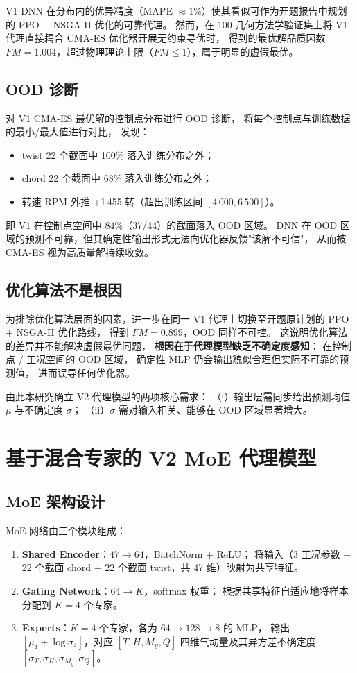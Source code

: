 V1 DNN 在分布内的优异精度（MAPE $\approx 1\%$）使其看似可作为开题报告中规划的 PPO + NSGA-II 优化的可靠代理。
然而，在 100 几何方法学验证集上将 V1 代理直接耦合 CMA-ES 优化器开展无约束寻优时，
得到的最优解品质因数 $FM = 1.004$，超过物理理论上限（$FM \leq 1$），属于明显的虚假最优。

\subsection{OOD 诊断}

对 V1 CMA-ES 最优解的控制点分布进行 OOD 诊断，
将每个控制点与训练数据的最小/最大值进行对比，
发现：
\begin{itemize}
  \item twist 22 个截面中 100\% 落入训练分布之外；
  \item chord 22 个截面中 68\% 落入训练分布之外；
  \item 转速 $\text{RPM}$ 外推 +1\,455 转（超出训练区间 $[4\,000, 6\,500]$）。
\end{itemize}
即 V1 在控制点空间中 84\%（37/44）的截面落入 OOD 区域。
DNN 在 OOD 区域的预测不可靠，但其确定性输出形式无法向优化器反馈"该解不可信"，
从而被 CMA-ES 视为高质量解持续收敛。

\subsection{优化算法不是根因}

为排除优化算法层面的因素，进一步在同一 V1 代理上切换至开题原计划的 PPO + NSGA-II 优化路线，
得到 $FM = 0.899$，OOD 同样不可控。
这说明优化算法的差异并不能解决虚假最优问题，
\textbf{根因在于代理模型缺乏不确定度感知}：
在控制点 / 工况空间的 OOD 区域，
确定性 MLP 仍会输出貌似合理但实际不可靠的预测值，
进而误导任何优化器。

由此本研究确立 V2 代理模型的两项核心需求：
（i）输出层需同步给出预测均值 $\mu$ 与不确定度 $\sigma$；
（ii）$\sigma$ 需对输入相关、能够在 OOD 区域显著增大。

\section{基于混合专家的 V2 MoE 代理模型}

\subsection{MoE 架构设计}

MoE 网络由三个模块组成：
\begin{enumerate}
  \item \textbf{Shared Encoder}：$47 \to 64$，BatchNorm + ReLU；
        将输入（3 工况参数 + 22 个截面 chord + 22 个截面 twist，共 47 维）映射为共享特征。
  \item \textbf{Gating Network}：$64 \to K$，softmax 权重；
        根据共享特征自适应地将样本分配到 $K = 4$ 个专家。
  \item \textbf{Experts}：$K = 4$ 个专家，各为 $64 \to 128 \to 8$ 的 MLP，
        输出 $[\mu_4 + \log\sigma_4]$，对应 $[T, H, M_y, Q]$ 四维气动量及其异方差不确定度
        $[\sigma_T, \sigma_H, \sigma_{M_y}, \sigma_Q]$。
\end{enumerate}

